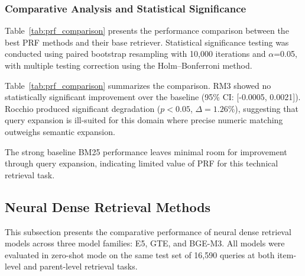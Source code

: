\documentclass[preprint,12pt]{elsarticle}
\begin{document}
\subsubsection{Comparative Analysis and Statistical Significance}

Table~\ref{tab:prf_comparison} presents the performance comparison between the best PRF methods and their base retriever. Statistical significance testing was conducted using paired bootstrap resampling with 10,000 iterations and $\alpha$=0.05, with multiple testing correction using the Holm--Bonferroni method.

\begin{table}[htbp]
\centering
\caption{Comparison of best PRF methods versus base retriever at item level. Statistical significance was assessed using bootstrap resampling (10,000 iterations) with Holm--Bonferroni correction.}
\label{tab:prf_comparison}
\end{table}

Table~\ref{tab:prf_comparison} summarizes the comparison. RM3 showed no statistically significant improvement over the baseline (95\% CI: [-0.0005, 0.0021]). Rocchio produced significant degradation ($p < 0.05$, $\Delta=1.26\%$), suggesting that query expansion is ill-suited for this domain where precise numeric matching outweighs semantic expansion.

The strong baseline BM25 performance leaves minimal room for improvement through query expansion, indicating limited value of PRF for this technical retrieval task.

\subsection{Neural Dense Retrieval Methods}

This subsection presents the comparative performance of neural dense retrieval models across three model families: E5, GTE, and BGE-M3. All models were evaluated in zero-shot mode on the same test set of 16,590 queries at both item-level and parent-level retrieval tasks.
\end{document}

